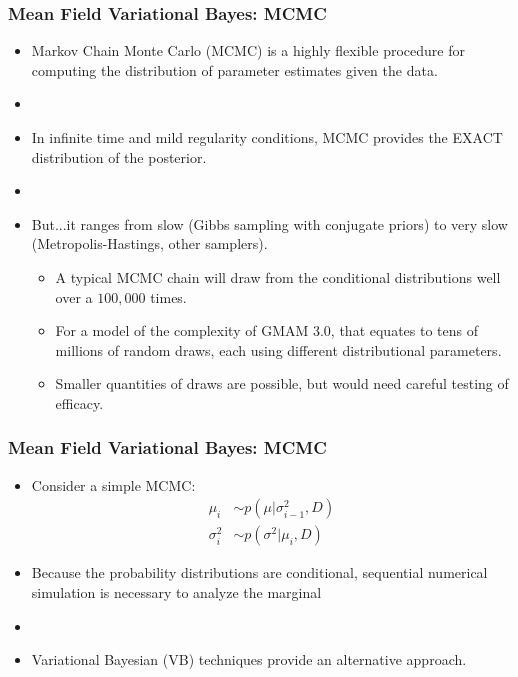 \documentclass[10pt, compress]{beamer}
\begin{document}
\begin{frame}[fragile]
\frametitle{Mean Field Variational Bayes: MCMC}
\begin{itemize}
    \item Markov Chain Monte Carlo (MCMC) is a highly flexible procedure for computing the distribution of parameter estimates given the data.
    \item []
    \item In infinite time and mild regularity conditions, MCMC provides the EXACT distribution of the posterior.
    \item []
    \item But...it ranges from slow (Gibbs sampling with conjugate priors) to very slow (Metropolis-Hastings, other samplers).
    \begin{itemize}
        \item A typical MCMC chain will draw from the conditional distributions well over a $100,000$ times. 
        \item For a model of the complexity of GMAM 3.0, that equates to tens of millions of random draws, each using different distributional parameters.
        \item Smaller quantities of draws are possible, but would need careful testing of efficacy.
    \end{itemize}
\end{itemize}
\end{frame}


\begin{frame}[fragile]
\frametitle{Mean Field Variational Bayes: MCMC}
\begin{itemize}
    \item Consider a simple MCMC:
    \begin{align}
        \mu_i &\sim p\left(\mu | \sigma^2_{i-1},D\right)\\
        \sigma^2_i &\sim p\left(\sigma^2 | \mu_i,D\right)
    \end{align}
    \item Because the probability distributions are conditional, sequential numerical simulation is necessary to analyze the marginal
    \item []
    \item Variational Bayesian (VB) techniques provide an alternative approach.
\end{itemize}
\end{frame}
\end{document}
